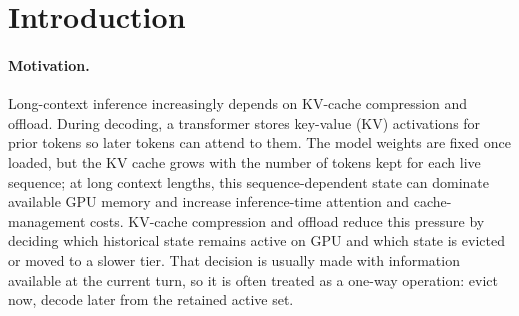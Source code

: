 \documentclass{article}
\begin{document}
\section{Introduction}

\paragraph{Motivation.}
Long-context inference increasingly depends on KV-cache compression and
offload.
During decoding, a transformer stores key-value (KV) activations for prior
tokens so later tokens can attend to them.
The model weights are fixed once loaded, but the KV cache grows with the
number of tokens kept for each live sequence; at long context lengths, this
sequence-dependent state can dominate available GPU memory and increase
inference-time attention and cache-management costs.
KV-cache compression and offload reduce this pressure by deciding which
historical state remains active on GPU and which state is evicted or moved
to a slower tier.
That decision is usually made with information available at the current
turn, so it is often treated as a one-way operation: evict now, decode
later from the retained active set.
\end{document}
